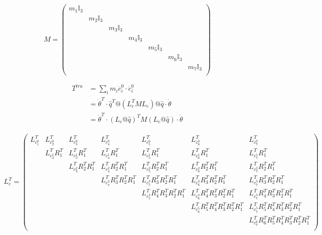 {\begin{equation*}
    M =
    \begin{pmatrix}
        m_1 \mathbb{I}_3 &  &  &  &  &  &  \\
         & m_2 \mathbb{I}_3 &  &  &  &  &  \\
         &  & m_3 \mathbb{I}_3 &  &  &  &  \\
         &  &  & m_4 \mathbb{I}_3 &  &  &  \\
         &  &  &  & m_5 \mathbb{I}_3 &  &  \\
         &  &  &  &  & m_6 \mathbb{I}_3 &  \\
         &  &  &  &  &  & m_7 \mathbb{I}_3 \\
    \end{pmatrix}
\end{equation*}

\begin{align*}
    T^{tra} &= \sum_i m_i \dot{c}_i^0 \cdot \dot{c}_i^0 \\
            &= \dot{\theta}^T \cdot \hat{q}^T @ (L_c^T M L_c) @ \hat{q} \cdot \dot{\theta} \\
            &= \dot{\theta}^T \cdot (L_c @ \hat{q})^T M (L_c @ \hat{q}) \cdot \dot{\theta}
\end{align*}

\begin{align*}
    L_c^T =
    \begin{pmatrix}
        L_{c_1^0}^T & L_{c_2^0}^T & L_{c_3^0}^T & L_{c_4^0}^T & L_{c_5^0}^T & L_{c_6^0}^T & L_{c_7^0}^T \\
         & L_{c_2^1}^T R_1^T & L_{c_3^1}^T R_1^T & L_{c_4^1}^T R_1^T & L_{c_5^1}^T R_1^T & L_{c_6^1}^T R_1^T & L_{c_7^1}^T R_1^T \\
         &  & L_{c_3^2}^T R_2^T R_1^T  & L_{c_4^2}^T R_2^T R_1^T  & L_{c_5^2}^T R_2^T R_1^T  & L_{c_6^2}^T R_2^T R_1^T  & L_{c_7^2}^T R_2^T R_1^T \\
         &  &  & L_{c_4^3}^T R_3^T R_2^T R_1^T & L_{c_5^3}^T R_3^T R_2^T R_1^T & L_{c_6^3}^T R_3^T R_2^T R_1^T & L_{c_7^3}^T R_3^T R_2^T R_1^T \\
         &  &  &  & L_{c_5^4}^T R_4^T R_3^T R_2^T R_1^T & L_{c_6^4}^T R_4^T R_3^T R_2^T R_1^T & L_{c_7^4}^T R_4^T R_3^T R_2^T R_1^T \\
         &  &  &  &  & L_{c_6^5}^T R_5^T R_4^T R_3^T R_2^T R_1^T & L_{c_7^5}^T R_5^T R_4^T R_3^T R_2^T R_1^T \\
         &  &  &  &  &  & L_{c_7^6}^T R_6^T R_5^T R_4^T R_3^T R_2^T R_1^T  \\
    \end{pmatrix}
\end{align*}




}
